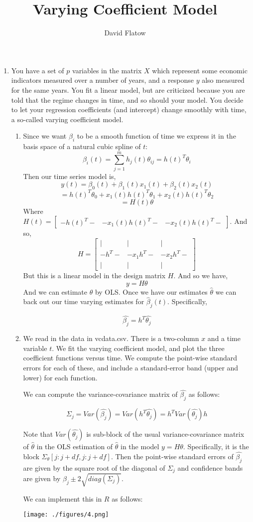 \documentclass[12pt]{article}
\title{Varying Coefficient Model}
\author{David Flatow}
\date{}
\newcommand{\B}{\beta}
\newcommand{\bmat}{\begin{bmatrix}}
\newcommand{\emat}{\end{bmatrix}}
\newcommand{\blist}{\begin{enumerate}}
\newcommand{\elist}{\end{enumerate}}
\begin{document}
\maketitle

\blist

\item You have a set of $p$ variables in the matrix $X$ which represent some economic indicators measured over a number of years, and a response $y$ also measured for the same years. You fit a linear model, but are criticized because you are told that the regime changes in time, and so should your model. You decide to let your regression coefficients (and intercept) change smoothly with time, a so-called varying coefficient model.

\blist

\item Since we want $\B_i$ to be a smooth function of time we express it in the basis space of a natural cubic spline of $t$:
$$ \B_i(t) = \sum_{j=1}^m h_j(t)\theta_{ij} = h(t)^T\theta_{i}$$
Then our time series model is,
$$y(t) = \B_0(t) + \B_1(t)x_1(t) + \B_2(t)x_2(t)$$
$$ = h(t)^T\theta_0 + x_1(t)h(t)^T\theta_1 +  x_2(t)h(t)^T\theta_2 $$
$$ = H(t)\theta $$
Where $H(t) = \bmat - h(t)^T - & - x_1(t)h(t)^T-& -x_2(t)h(t)^T - \emat $. And so,
$$ H = \bmat | & | & |  \\ - h^T - & - x_1h^T - & - x_2h^T - \\ | & | & | \emat $$
But this is a linear model in the design matrix $H$. And so we have,
$$ y = H\theta $$
And we can estimate $\theta$ by OLS. Once we have our estimates $\hat{\theta}$ we can back out our time varying estimates for $\hat{\B}_j(t)$. Specifically, 

$$ \hat{\B_j} = h^T\hat{\theta_j}$$


\item We read in the data in vcdata.csv. There is a two-column $x$ and a time variable $t$. We fit the varying coefficient model, and plot the three coefficient functions versus time. We compute the point-wise standard errors for each of these, and include a standard-error band (upper and lower) for each function.

We can compute the variance-covariance matrix of $\hat{\B_j}$ as follows:

$$\Sigma_j = Var(\hat{\B_j}) = Var(h^T\hat{\theta_j}) = h^T Var(\hat{\theta_j})h$$

Note that $Var(\hat{\theta_j})$ is sub-block of the usual variance-covariance matrix of $\hat{\theta}$ in the OLS estimation of $\hat{\theta}$ in the model $y = H\theta$. Specifically, it is the block $\Sigma_{\theta}[j:j+df, j:j+df]$. Then the point-wise standard errors of $\hat{\beta_j}$ are given by the square root of the diagonal of $\Sigma_j$ and confidence bands are given by $\beta_j \pm 2 \sqrt{diag(\Sigma_j)}$.

We can implement this in $R$ as follows:



\begin{center}
\texttt{[image: ./figures/4.png]}
\end{center}



\elist
\elist
\end{document}
